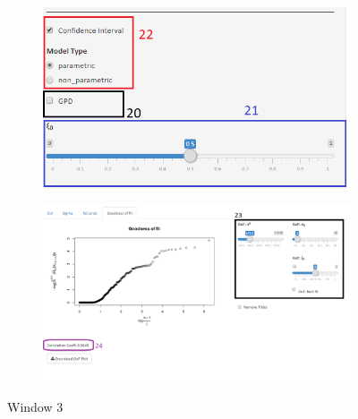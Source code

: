 \begin{subappendices}
\begin{landscape}
  \begin{figure} 
  	\centering
		\begin{subfigure}[h]{0.40\linewidth}
		 \includegraphics[width=\textwidth]{./plots/shiny_window3.PNG}
		\end{subfigure}
		\hspace{\fill}
		\begin{subfigure}[h]{0.90\linewidth}
		 \includegraphics[width=\textwidth]{./plots/shiny_window4.PNG}
		\end{subfigure}
		    \caption{Window 3}
  \label{fig:shiny_window3}
\end{figure}
\end{landscape}

\end{subappendices}

 